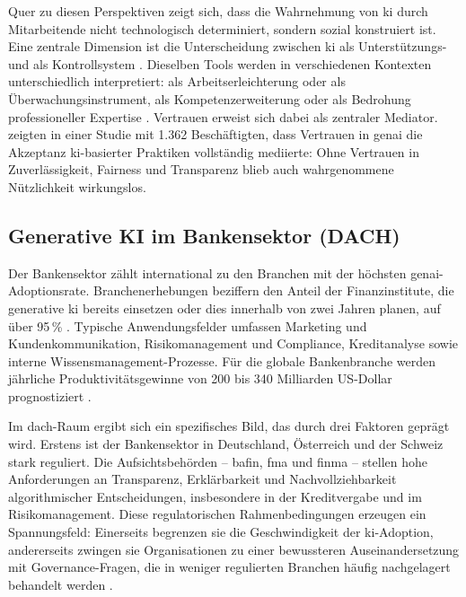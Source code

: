 Quer zu diesen Perspektiven zeigt sich, dass die Wahrnehmung von \gls{ki} durch Mitarbeitende nicht technologisch determiniert, sondern sozial konstruiert ist. Eine zentrale Dimension ist die Unterscheidung zwischen \gls{ki} als Unterstützungs- und als Kontrollsystem \parencite{edwardsManagerialControlFeedback2024}. Dieselben Tools werden in verschiedenen Kontexten unterschiedlich interpretiert: als Arbeitserleichterung oder als Überwachungsinstrument, als Kompetenzerweiterung oder als Bedrohung professioneller Expertise \parencite{monodWorkerEmpowermentManagerial2024}. Vertrauen erweist sich dabei als zentraler Mediator. \textcite{prasadGenerativeAICatalyst2024} zeigten in einer Studie mit 1.362 Beschäftigten, dass Vertrauen in \gls{genai} die Akzeptanz \acrshort{ki}-basierter Praktiken vollständig mediierte: Ohne Vertrauen in Zuverlässigkeit, Fairness und Transparenz blieb auch wahrgenommene Nützlichkeit wirkungslos.


\subsection{Generative KI im Bankensektor (DACH)}

Der Bankensektor zählt international zu den Branchen mit der höchsten \acrshort{genai}-Adoptionsrate. Branchenerhebungen beziffern den Anteil der Finanzinstitute, die generative \gls{ki} bereits einsetzen oder dies innerhalb von zwei Jahren planen, auf über 95\,\% \parencite{YourJourneyGenAIa}. Typische Anwendungsfelder umfassen Marketing und Kundenkommunikation, Risikomanagement und Compliance, Kreditanalyse sowie interne Wissensmanagement-Prozesse. Für die globale Bankenbranche werden jährliche Produktivitätsgewinne von 200 bis 340 Milliarden US-Dollar prognostiziert \parencite{mckinseycompanyCapturingFullValue}.

Im \acrshort{dach}-Raum ergibt sich ein spezifisches Bild, das durch drei Faktoren geprägt wird. Erstens ist der Bankensektor in Deutschland, Österreich und der Schweiz stark reguliert. Die Aufsichtsbehörden -- \gls{bafin}, \gls{fma} und \gls{finma} -- stellen hohe Anforderungen an Transparenz, Erklärbarkeit und Nachvollziehbarkeit algorithmischer Entscheidungen, insbesondere in der Kreditvergabe und im Risikomanagement. Diese regulatorischen Rahmenbedingungen erzeugen ein Spannungsfeld: Einerseits begrenzen sie die Geschwindigkeit der \acrshort{ki}-Adoption, andererseits zwingen sie Organisationen zu einer bewussteren Auseinandersetzung mit Governance-Fragen, die in weniger regulierten Branchen häufig nachgelagert behandelt werden \parencite{hundertmarkIFZGenerativeAI2024}.

